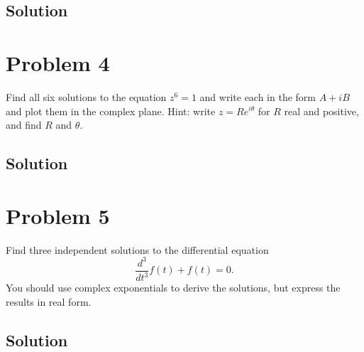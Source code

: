 \documentclass[12pt]{article}
\begin{document}
\subsection*{Solution}


\pagebreak
\section{Problem 4}
Find all six solutions to the equation $z^6 = 1$ and write each in the form $A + iB$ and plot them in the complex plane. Hint: write $z = Re^{i\theta}$ for $R$ real and positive, and ﬁnd $R$ and $\theta$.


\subsection*{Solution}


\pagebreak
\section{Problem 5}
Find three independent solutions to the differential equation
\[ \frac{d^3}{dt^3} f(t) + f(t) = 0. \]
You should use complex exponentials to derive the solutions, but express the results in real
form.


\subsection*{Solution}
\end{document}
